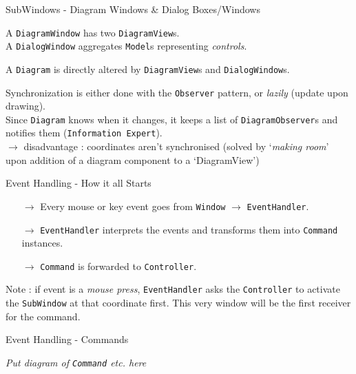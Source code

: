 \documentclass[10pt]{beamer}
\begin{document}
\begin{frame}[fragile]{SubWindows - Diagram Windows \& Dialog Boxes/Windows}
	\begin{center}
	A \texttt{DiagramWindow} has two \texttt{DiagramView}s.
	\\A \texttt{DialogWindow} aggregates \texttt{Model}s representing \textit{controls}.
	
	\vspace{0.5cm}
	A \texttt{Diagram} is directly altered by \texttt{DiagramView}s and \texttt{DialogWindow}s.
	
	\vspace{0.5cm}
	Synchronization is either done with the \texttt{Observer} pattern, or \textit{lazily} (update upon drawing).
	\\ Since \texttt{Diagram} knows when it changes, it keeps a list of \texttt{DiagramObserver}s and notifies them (\texttt{Information Expert}).
	\\$\rightarrow$ disadvantage : coordinates aren't synchronised (solved by `\textit{making room}' upon addition of a diagram component to a `DiagramView')
	\end{center}
\end{frame}

\begin{frame}[fragile]{Event Handling - How it all Starts}
	\begin{center}
	\begin{itemize}
	\item[$\rightarrow$] Every mouse or key event goes from \texttt{Window} $\rightarrow$ \texttt{EventHandler}.
	\item[$\rightarrow$] \texttt{EventHandler} interprets the events and transforms them into \texttt{Command} instances.
	\item[$\rightarrow$] \texttt{Command} is forwarded to \texttt{Controller}.
	\end{itemize}
	Note : if event is a \textit{mouse press}, \texttt{EventHandler} asks the \texttt{Controller} to activate the \texttt{SubWindow} at that coordinate first. This very window will be the first receiver for the command. 
	\end{center}
\end{frame}

\begin{frame}[fragile]{Event Handling - Commands}
	\begin{center}
	\textit{Put diagram of \texttt{Command} etc. here}
	\end{center}
\end{frame}
\end{document}
